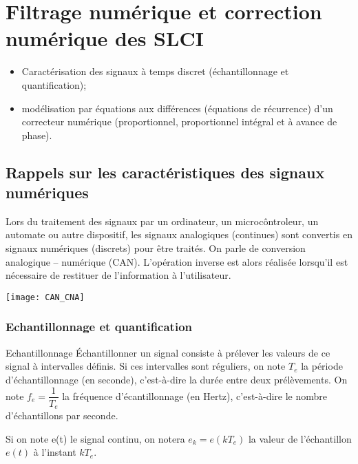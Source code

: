 \setchapterpreamble[u]{\margintoc}

\chapter{Filtrage numérique et correction numérique des SLCI}



\begin{obj}

\begin{itemize}
\item Caractérisation des signaux à temps discret (échantillonnage et quantification);
\item modélisation par équations aux différences (équations de récurrence) d'un correcteur numérique (proportionnel, proportionnel intégral et à avance de phase).
\end{itemize}
\end{obj}






\section{Rappels sur les caractéristiques des signaux numériques}
Lors du traitement des signaux par un ordinateur, un microcôntroleur, un automate ou autre dispositif, les signaux analogiques (continues) sont convertis en signaux numériques (discrets) pour être traités. On parle de conversion analogique -- numérique (CAN). 
L'opération inverse est alors réalisée lorsqu'il est nécessaire de restituer de l'information à l'utilisateur.
\begin{center}
\texttt{[image: CAN\_CNA]}
\end{center}

\subsection{Echantillonnage et quantification}

\begin{defi}{Echantillonnage}
Échantillonner un signal consiste à prélever les valeurs de ce signal à intervalles définis. Si ces intervalles sont réguliers, on note $T_e$ la période d'échantillonnage (en seconde), c'est-à-dire la durée entre deux prélèvements. On note $f_e = \dfrac{1}{T_e}$ la fréquence d'écantillonnage (en Hertz), c'est-à-dire le nombre d'échantillons par seconde.

Si on note e(t) le signal continu, on notera $e_k = e(kT_e)$ la valeur de l'échantillon $e(t)$ à l'instant $kT_e$. 

\end{defi}

